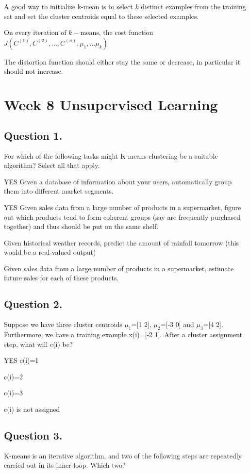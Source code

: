 \documentclass[11pt]{article} %
\begin{document}
A good way to initialize k-mean is to select $k$ distinct examples from the training set and set the cluster centroids equal to these selected examples.

On every iteration of $k-$means, the cost function $J(C^{(1)},C^{(2)},\ldots, C^{(n)},
\mu_1,\ldots \mu_k)$

The distortion function should either stay the same or decrease, in particular it should not increase.


\section{Week 8 Unsupervised Learning}

\subsection{ Question 1. } 
For which of the following tasks might K-means clustering be a suitable algorithm? Select all that apply.

YES Given a database of information about your users, automatically group them into different market segments.

YES Given sales data from a large number of products in a supermarket, figure out which products tend to form coherent groups (say are frequently purchased together) and thus should be put on the same shelf.

Given historical weather records, predict the amount of rainfall tomorrow (this would be a real-valued output)

Given sales data from a large number of products in a supermarket, estimate future sales for each of these products.
\subsection{ Question 2. }
Suppose we have three cluster centroids $\mu_1$=[1 2], $\mu_2$=[-3 0] and $\mu_3$=[4 2]. 
Furthermore, we have a training example x(i)=[-2 1]. After a cluster assignment step, what will c(i) be?

YES c(i)=1

c(i)=2

c(i)=3

c(i) is not assigned


\subsection{ Question 3. }
K-means is an iterative algorithm, and two of the following steps are repeatedly carried out in its inner-loop. Which two?
\end{document}
